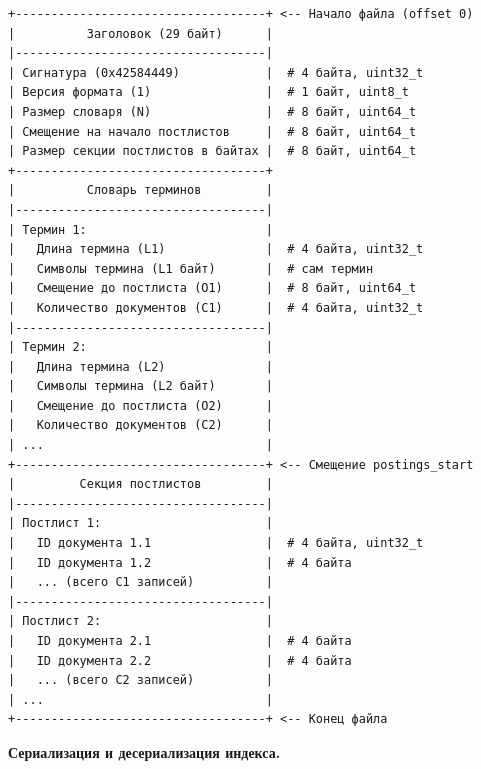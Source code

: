 \begin{verbatim}
+-----------------------------------+ <-- Начало файла (offset 0)
|          Заголовок (29 байт)      |
|-----------------------------------|
| Сигнатура (0x42584449)            |  # 4 байта, uint32_t
| Версия формата (1)                |  # 1 байт, uint8_t
| Размер словаря (N)                |  # 8 байт, uint64_t
| Смещение на начало постлистов     |  # 8 байт, uint64_t
| Размер секции постлистов в байтах |  # 8 байт, uint64_t
+-----------------------------------+
|          Словарь терминов         |
|-----------------------------------|
| Термин 1:                         |
|   Длина термина (L1)              |  # 4 байта, uint32_t
|   Символы термина (L1 байт)       |  # сам термин
|   Смещение до постлиста (O1)      |  # 8 байт, uint64_t
|   Количество документов (C1)      |  # 4 байта, uint32_t
|-----------------------------------|
| Термин 2:                         |
|   Длина термина (L2)              |
|   Символы термина (L2 байт)       |
|   Смещение до постлиста (O2)      |
|   Количество документов (C2)      |
| ...                               |
+-----------------------------------+ <-- Смещение postings_start
|         Секция постлистов         |
|-----------------------------------|
| Постлист 1:                       |
|   ID документа 1.1                |  # 4 байта, uint32_t
|   ID документа 1.2                |  # 4 байта
|   ... (всего C1 записей)          |
|-----------------------------------|
| Постлист 2:                       |
|   ID документа 2.1                |  # 4 байта
|   ID документа 2.2                |  # 4 байта
|   ... (всего C2 записей)          |
| ...                               |
+-----------------------------------+ <-- Конец файла
\end{verbatim}

\pagebreak

\noindent\textbf{Сериализация и десериализация индекса.}

